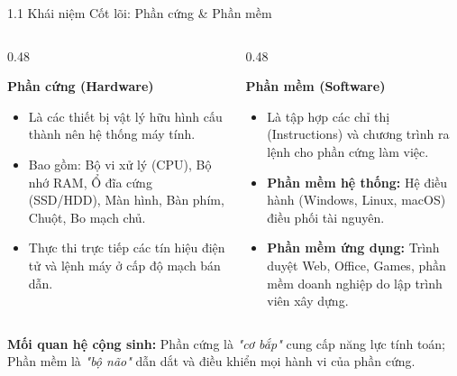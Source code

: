 \documentclass[aspectratio=169, 10pt]{beamer}
\begin{document}
\begin{frame}{1.1 Khái niệm Cốt lõi: Phần cứng \& Phần mềm}
  \begin{columns}[T]
    \begin{column}{0.48\textwidth}
      \begin{block}{\textbf{Phần cứng (Hardware)}}
        \begin{itemize}
          \item Là các thiết bị vật lý hữu hình cấu thành nên hệ thống máy tính.
          \item Bao gồm: Bộ vi xử lý (CPU), Bộ nhớ RAM, Ổ đĩa cứng (SSD/HDD), Màn hình, Bàn phím, Chuột, Bo mạch chủ.
          \item Thực thi trực tiếp các tín hiệu điện tử và lệnh máy ở cấp độ mạch bán dẫn.
        \end{itemize}
      \end{block}
    \end{column}
    \begin{column}{0.48\textwidth}
      \begin{block}{\textbf{Phần mềm (Software)}}
        \begin{itemize}
          \item Là tập hợp các chỉ thị (Instructions) và chương trình ra lệnh cho phần cứng làm việc.
          \item \textbf{Phần mềm hệ thống:} Hệ điều hành (Windows, Linux, macOS) điều phối tài nguyên.
          \item \textbf{Phần mềm ứng dụng:} Trình duyệt Web, Office, Games, phần mềm doanh nghiệp do lập trình viên xây dựng.
        \end{itemize}
      \end{block}
    \end{column}
  \end{columns}
  \vskip 2mm
  \begin{alertblock}{\textbf{Mối quan hệ cộng sinh:}}
    Phần cứng là \textit{"cơ bắp"} cung cấp năng lực tính toán; Phần mềm là \textit{"bộ não"} dẫn dắt và điều khiển mọi hành vi của phần cứng.
  \end{alertblock}
\end{frame}
\end{document}
